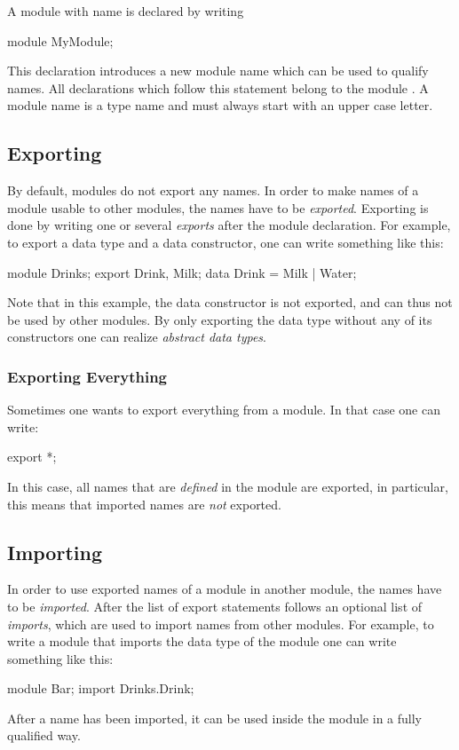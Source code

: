 A module with name  is declared by writing 
\begin{abscode}
module MyModule;
\end{abscode}
This declaration introduces a new module name  which can be
used to qualify names.
All declarations which follow this statement belong to the module .
A module name is a type name and must always start with an upper case letter.

\subsection{Exporting}
By default, modules do not export any names.
In order to make names of a module usable to other modules, the names have to be \emph{exported}.
Exporting is done by writing one or several \emph{exports} after the module declaration.
For example, to export a data type and a data constructor, one can write something like this:
\begin{abscode}
module Drinks;
export Drink, Milk;
data Drink = Milk | Water;
\end{abscode}

Note that in this example, the data constructor  is not exported, and can thus not be used by other modules.
By only exporting the data type without any of its constructors one can realize \emph{abstract data types}.

\subsubsection{Exporting Everything}
Sometimes one wants to export everything from a module.
In that case one can write:
\begin{abscode}
export *;
\end{abscode}
In this case, all names that are \emph{defined} in the module are exported, in particular, this means that imported names are \emph{not} exported.

\subsection{Importing}
In order to use exported names of a module in another module, the names have to be \emph{imported}.
After the list of export statements follows an optional list of \emph{imports}, which are used to import names from other modules.
For example, to write a module that imports the  data type of the module  one can write something like this:
\begin{abscode}
module Bar;
import Drinks.Drink;  
\end{abscode}
After a name has been imported, it can be used inside the module in a fully qualified way.

